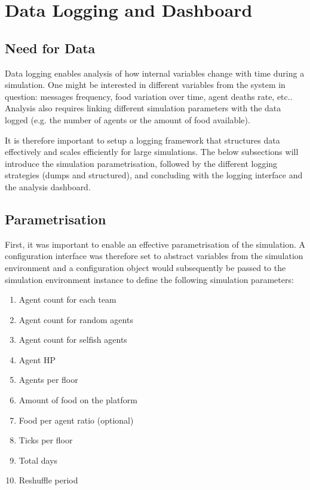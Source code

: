 \chapter{Data Logging and Dashboard}\label{data_logging}

\section{Need for Data}

Data logging enables analysis of how internal variables change with time during a simulation. One might be interested in different variables from the system in question: messages frequency, food variation over time, agent deaths rate, etc.. Analysis also requires linking different simulation parameters with the data logged (e.g. the number of agents or the amount of food available). 

It is therefore important to setup a logging framework that structures data effectively and scales efficiently for large simulations. The below subsections will introduce the simulation parametrisation, followed by the different logging strategies (dumps and structured), and concluding with the logging interface and the analysis dashboard.

\section{Parametrisation}

First, it was important to enable an effective parametrisation of the simulation. A configuration interface was therefore set to abstract variables from the simulation environment and a configuration object would subsequently be passed to the simulation environment instance to define the following simulation parameters:

\begin{multicols}{2}
    \begin{enumerate}
        \item Agent count for each team
        \item Agent count for random agents
        \item Agent count for selfish agents
        \item Agent HP
        \item Agents per floor
        \item Amount of food on the platform
        \item Food per agent ratio (optional)
        \item Ticks per floor
        \item Total days
        \item Reshuffle period
    \end{enumerate}
\end{multicols}

